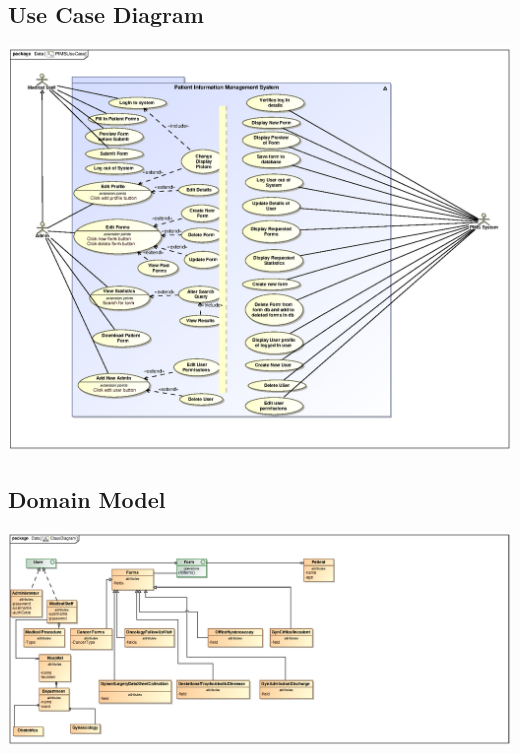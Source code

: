 \documentclass[a4paper,12pt,titlepage]{article}
\begin{document}


\tableofcontents
\newpage


\begin{center}
\section{Use Case Diagram}
\end{center}
\includegraphics[width=\linewidth]{./Graphics/PIMSUseCase}
\pagebreak

\begin{landscape}

\begin{center}
\section{Domain Model}
\end{center}
\includegraphics[width=\linewidth]{./Graphics/ClassDiagramRefined}
\end{landscape}
\pagebreak












\end{document}
